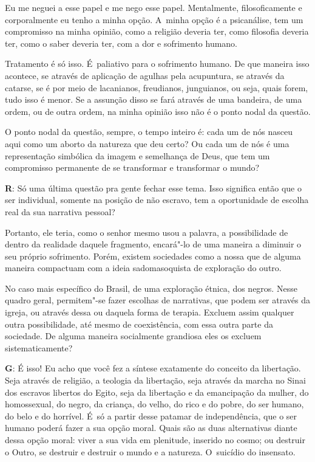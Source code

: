 Eu me neguei a esse papel e me nego esse papel. Mentalmente,
filosoficamente e corporalmente eu tenho a minha opção. A~minha opção é
a psicanálise, tem um compromisso na minha opinião, como a religião
deveria ter, como filosofia deveria ter, como o saber deveria ter, com a
dor e sofrimento humano.

Tratamento é só isso. É~paliativo para o sofrimento humano. De que
maneira isso acontece, se através de aplicação de agulhas pela
acupuntura, se através da catarse, se é por meio de lacanianos,
freudianos, junguianos, ou seja, quais forem, tudo isso é menor. Se a
assunção disso se fará através de uma bandeira, de uma ordem, ou de
outra ordem, na minha opinião isso não é o ponto nodal da questão.

 

O ponto nodal da questão, sempre, o tempo inteiro é: cada um de nós
nasceu aqui como um aborto da natureza que deu certo? Ou cada um de nós
é uma representação simbólica da imagem e semelhança de Deus, que tem um
compromisso permanente de se transformar e transformar o mundo?

 

\textbf{R}: Só uma última questão pra gente fechar esse tema. Isso
significa então que o ser individual, somente na posição de não
escravo, tem a oportunidade de escolha real da sua narrativa pessoal?

 

Portanto, ele teria, como o senhor mesmo usou a palavra, a possibilidade
de dentro da realidade daquele fragmento, encará"-lo de uma maneira a
diminuir o seu próprio sofrimento. Porém, existem sociedades como a
nossa que de alguma maneira compactuam com a ideia sadomasoquista de
exploração do outro.

 

No caso mais específico do Brasil, de uma exploração étnica, dos negros.
Nesse quadro geral, permitem"-se fazer escolhas de narrativas, que podem
ser através da igreja, ou através dessa ou daquela forma de terapia.
Excluem assim qualquer outra possibilidade, até mesmo de coexistência,
com essa outra parte da sociedade. De alguma maneira socialmente
grandiosa eles os excluem sistematicamente?

 

\textbf{G}: É isso! Eu acho que você fez a síntese exatamente do
conceito da libertação. Seja através de religião, a teologia da
libertação, seja através da marcha no Sinai dos escravos libertos do
Egito, seja da libertação e da emancipação da mulher, do homossexual, do
negro, da criança, do velho, do rico e do pobre, do ser humano, do belo
e do horrível. É~só a partir desse patamar de independência, que o ser
humano poderá fazer a sua opção moral. Quais são as duas alternativas
diante dessa opção moral: viver a sua vida em plenitude, inserido no
cosmo; ou destruir o Outro, se destruir e destruir o mundo e a natureza.
O~suicídio do insensato.

\fechafala 
